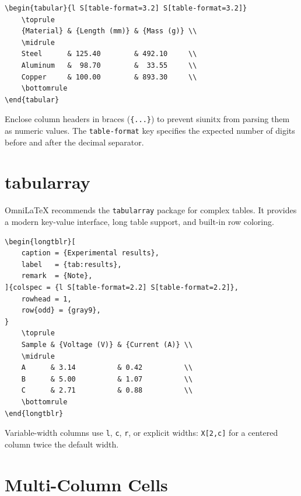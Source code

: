 \begin{verbatim}
\begin{tabular}{l S[table-format=3.2] S[table-format=3.2]}
    \toprule
    {Material} & {Length (mm)} & {Mass (g)} \\
    \midrule
    Steel      & 125.40        & 492.10     \\
    Aluminum   &  98.70        &  33.55     \\
    Copper     & 100.00        & 893.30     \\
    \bottomrule
\end{tabular}
\end{verbatim}

Enclose column headers in braces (\texttt{\{...\}}) to prevent siunitx from
parsing them as numeric values. The \texttt{table-format} key specifies the
expected number of digits before and after the decimal separator.

\section{tabularray}

OmniLaTeX recommends the \texttt{tabularray} package for complex tables. It
provides a modern key-value interface, long table support, and built-in
row coloring.

\begin{verbatim}
\begin{longtblr}[
    caption = {Experimental results},
    label   = {tab:results},
    remark  = {Note},
]{colspec = {l S[table-format=2.2] S[table-format=2.2]},
    rowhead = 1,
    row{odd} = {gray9},
}
    \toprule
    Sample & {Voltage (V)} & {Current (A)} \\
    \midrule
    A      & 3.14          & 0.42          \\
    B      & 5.00          & 1.07          \\
    C      & 2.71          & 0.88          \\
    \bottomrule
\end{longtblr}
\end{verbatim}

Variable-width columns use \texttt{l}, \texttt{c}, \texttt{r}, or explicit
widths: \texttt{X[2,c]} for a centered column twice the default width.

\section{Multi-Column Cells}

